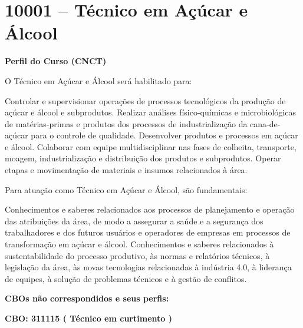 \documentclass[
]{article}
\begin{document}
\newpage
\section{ 10001 -- Técnico em Açúcar e Álcool }

\textbf{Perfil do Curso (CNCT)}

O Técnico em Açúcar e Álcool será habilitado para:

Controlar e supervisionar operações de processos tecnológicos da
produção de açúcar e álcool e subprodutos. Realizar análises
físico-químicas e microbiológicas de matérias-primas e produtos dos
processos de industrialização da cana-de-açúcar para o controle de
qualidade. Desenvolver produtos e processos em açúcar e álcool.
Colaborar com equipe multidisciplinar nas fases de colheita, transporte,
moagem, industrialização e distribuição dos produtos e subprodutos.
Operar etapas e movimentação de materiais e insumos relacionados à área.

Para atuação como Técnico em Açúcar e Álcool, são fundamentais:

Conhecimentos e saberes relacionados aos processos de planejamento e
operação das atribuições da área, de modo a assegurar a saúde e a
segurança dos trabalhadores e dos futuros usuários e operadores de
empresas em processos de transformação em açúcar e álcool. Conhecimentos
e saberes relacionados à sustentabilidade do processo produtivo, às
normas e relatórios técnicos, à legislação da área, às novas tecnologias
relacionadas à indústria 4.0, à liderança de equipes, à solução de
problemas técnicos e à gestão de conflitos.

\textbf{CBOs não correspondidos e seus perfis:}

\textbf{CBO: 311115  ( Técnico em curtimento )}
\end{document}
